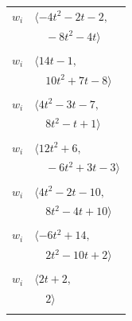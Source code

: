 \documentclass[11pt]{article}
\begin{document}
\begin{longtable}{@{}ll@{}}
$w_i$ & $\langle -4t^{2}-2t-2,$\\
 & $\quad -8t^{2}-4t\rangle$\\
\addlinespace[2pt]
\multicolumn{2}{@{}p{0.97\textwidth}@{}}{$i=24$, $D_i=1$, $\rho_{ij}$: $4{:}1, \allowbreak 6{:}1, \allowbreak 8{:}3, \allowbreak 10{:}1, \allowbreak 12{:}1, \allowbreak 18{:}2, \allowbreak 20{:}3, \allowbreak 39{:}3, \allowbreak 40{:}3$}\\
$w_i$ & $\langle 14t-1,$\\
 & $\quad 10t^{2}+7t-8\rangle$\\
\addlinespace[2pt]
\multicolumn{2}{@{}p{0.97\textwidth}@{}}{$i=25$, $D_i=1$, $\rho_{ij}$: $4{:}1, \allowbreak 9{:}1, \allowbreak 10{:}3, \allowbreak 14{:}1, \allowbreak 18{:}3, \allowbreak 20{:}2, \allowbreak 21{:}2, \allowbreak 34{:}1, \allowbreak 39{:}3$}\\
$w_i$ & $\langle 4t^{2}-3t-7,$\\
 & $\quad 8t^{2}-t+1\rangle$\\
\addlinespace[2pt]
\multicolumn{2}{@{}p{0.97\textwidth}@{}}{$i=26$, $D_i=1$, $\rho_{ij}$: $6{:}1, \allowbreak 13{:}3, \allowbreak 15{:}2, \allowbreak 19{:}1, \allowbreak 20{:}2, \allowbreak 21{:}2, \allowbreak 34{:}2$}\\
$w_i$ & $\langle 12t^{2}+6,$\\
 & $\quad -6t^{2}+3t-3\rangle$\\
\addlinespace[2pt]
\multicolumn{2}{@{}p{0.97\textwidth}@{}}{$i=27$, $D_i=2$, $\rho_{ij}$: $0{:}1, \allowbreak 2{:}1, \allowbreak 7{:}1, \allowbreak 16{:}3, \allowbreak 32{:}1, \allowbreak 33{:}2, \allowbreak 36{:}2$}\\
$w_i$ & $\langle 4t^{2}-2t-10,$\\
 & $\quad 8t^{2}-4t+10\rangle$\\
\addlinespace[2pt]
\multicolumn{2}{@{}p{0.97\textwidth}@{}}{$i=28$, $D_i=2$, $\rho_{ij}$: $0{:}1, \allowbreak 2{:}3, \allowbreak 8{:}1, \allowbreak 37{:}2, \allowbreak 41{:}3$}\\
$w_i$ & $\langle -6t^{2}+14,$\\
 & $\quad 2t^{2}-10t+2\rangle$\\
\addlinespace[2pt]
\multicolumn{2}{@{}p{0.97\textwidth}@{}}{$i=29$, $D_i=1$, $\rho_{ij}$: $16{:}1, \allowbreak 17{:}2, \allowbreak 33{:}1, \allowbreak 39{:}1$}\\
$w_i$ & $\langle 2t+2,$\\
 & $\quad 2\rangle$\\
\addlinespace[2pt]
\multicolumn{2}{@{}p{0.97\textwidth}@{}}{$i=30$, $D_i=1$, $\rho_{ij}$: $2{:}2, \allowbreak 3{:}2, \allowbreak 5{:}1, \allowbreak 11{:}2, \allowbreak 14{:}1, \allowbreak 19{:}1, \allowbreak 21{:}3, \allowbreak 36{:}2, \allowbreak 37{:}1, \allowbreak 40{:}3, \allowbreak 41{:}2$}\\

\end{longtable}
\end{document}
